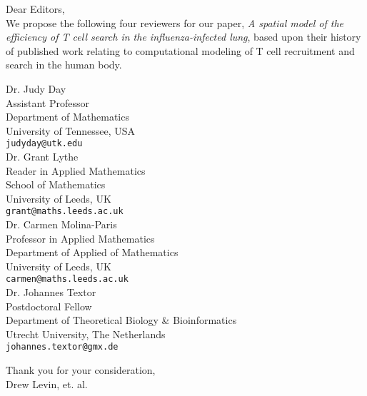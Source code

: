 \documentclass{article}
\begin{document}

\noindent Dear Editors, \\

We propose the following four reviewers for our paper, \textit{A spatial model of the efficiency of T cell search in the influenza-infected lung},  based upon their history of published work relating to computational modeling of T cell recruitment and search in the human body. \\
\vspace{0.25in}

\noindent Dr. Judy Day\\
Assistant Professor \\
Department of Mathematics \\
University of Tennessee, USA \\
\texttt{judyday@utk.edu} \\

\noindent Dr. Grant Lythe \\
Reader in Applied Mathematics \\
School of Mathematics \\
University of Leeds, UK \\
\texttt{grant@maths.leeds.ac.uk} \\

\noindent Dr. Carmen Molina-Paris \\
Professor in Applied Mathematics \\
Department of Applied of Mathematics \\
University of Leeds, UK \\
\texttt{carmen@maths.leeds.ac.uk} \\

\noindent Dr. Johannes Textor \\
Postdoctoral Fellow \\
Department of Theoretical Biology \& Bioinformatics \\
Utrecht University, The Netherlands \\
\texttt{johannes.textor@gmx.de} \\

\vspace{0.25in}

\noindent Thank you for your consideration, \\

Drew Levin, et. al.
\end{document}
